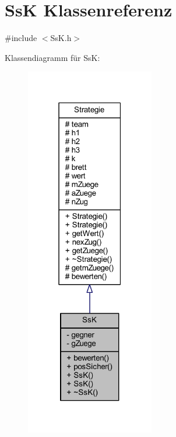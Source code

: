 \hypertarget{class_ss_k}{}\section{Ss\+K Klassenreferenz}
\label{class_ss_k}


{\ttfamily \#include $<$Ss\+K.\+h$>$}



Klassendiagramm für Ss\+K\+:\nopagebreak
\begin{figure}[H]
\begin{center}
\leavevmode
\includegraphics[width=159pt]{class_ss_k__inherit__graph}
\end{center}
\end{figure}


